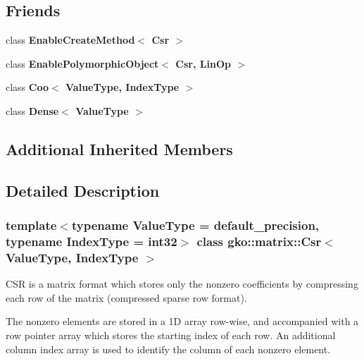 \subsection*{Friends}
\begin{DoxyCompactItemize}
\item 
\mbox{\label{classgko_1_1matrix_1_1Csr_ad8cd96663ce0ef68ea6d54f3d163df35}} 
class {\bfseries Enable\+Create\+Method$<$ Csr $>$}
\item 
\mbox{\label{classgko_1_1matrix_1_1Csr_a6fa2ee2c326608dac42afed82be6713c}} 
class {\bfseries Enable\+Polymorphic\+Object$<$ Csr, Lin\+Op $>$}
\item 
\mbox{\label{classgko_1_1matrix_1_1Csr_ad2572ffab980b4728254b155909b3119}} 
class {\bfseries Coo$<$ Value\+Type, Index\+Type $>$}
\item 
\mbox{\label{classgko_1_1matrix_1_1Csr_a22a84c8f67f946aa60a2fa8bf5835a32}} 
class {\bfseries Dense$<$ Value\+Type $>$}
\end{DoxyCompactItemize}
\subsection*{Additional Inherited Members}


\subsection{Detailed Description}
\subsubsection*{template$<$typename Value\+Type = default\+\_\+precision, typename Index\+Type = int32$>$\newline
class gko\+::matrix\+::\+Csr$<$ Value\+Type, Index\+Type $>$}

C\+SR is a matrix format which stores only the nonzero coefficients by compressing each row of the matrix (compressed sparse row format). 

The nonzero elements are stored in a 1D array row-\/wise, and accompanied with a row pointer array which stores the starting index of each row. An additional column index array is used to identify the column of each nonzero element.


